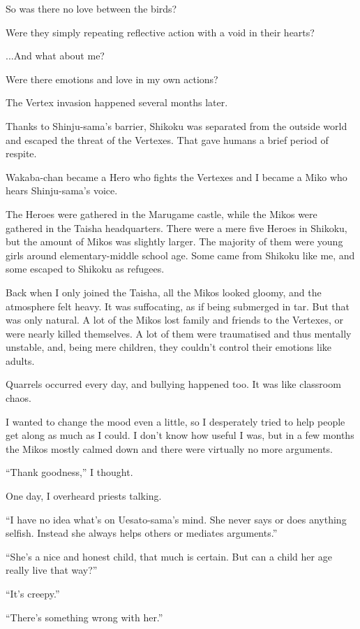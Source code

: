 So was there no love between the birds?

Were they simply repeating reflective action with a void in their hearts?

...And what about me?

Were there emotions and love in my own actions?

The Vertex invasion happened several months later.

Thanks to Shinju-sama's barrier, Shikoku was separated from the outside world and escaped the threat of the Vertexes. That gave humans a brief period of respite.

Wakaba-chan became a Hero who fights the Vertexes and I became a Miko who hears Shinju-sama's voice.

The Heroes were gathered in the Marugame castle, while the Mikos were gathered in the Taisha headquarters. There were a mere five Heroes in Shikoku, but the amount of Mikos was slightly larger. The majority of them were young girls around elementary-middle school age. Some came from Shikoku like me, and some escaped to Shikoku as refugees.

Back when I only joined the Taisha, all the Mikos looked gloomy, and the atmosphere felt heavy. It was suffocating, as if being submerged in tar. But that was only natural. A lot of the Mikos lost family and friends to the Vertexes, or were nearly killed themselves. A lot of them were traumatised and thus mentally unstable, and, being mere children, they couldn't control their emotions like adults.

Quarrels occurred every day, and bullying happened too. It was like classroom chaos.

I wanted to change the mood even a little, so I desperately tried to help people get along as much as I could. I don't know how useful I was, but in a few months the Mikos mostly calmed down and there were virtually no more arguments.

``Thank goodness,'' I thought.

One day, I overheard priests talking.

``I have no idea what's on Uesato-sama's mind. She never says or does anything selfish. Instead she always helps others or mediates arguments.''

``She's a nice and honest child, that much is certain. But can a child her age really live that way?''

``It's creepy.''

``There's something wrong with her.''

